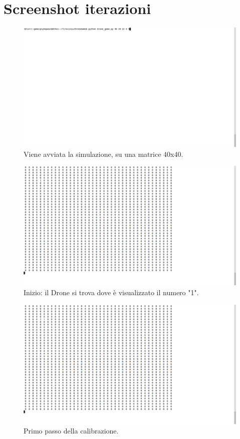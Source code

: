 \section{Screenshot iterazioni}

\begin{figure}[hb]
\center
\includegraphics[width=\textwidth]{immagini/Run1.png}
\caption{Viene avviata la simulazione, su una matrice 40x40.}
\end{figure}

\begin{figure}[hb]
\center
\includegraphics[width=\textwidth]{immagini/Run2.png}
\caption{Inizio: il Drone si trova dove è visualizzato il numero "1".}
\end{figure}

\begin{figure}[hb]
\center
\includegraphics[width=\textwidth]{immagini/Run3.png}
\caption{Primo passo della calibrazione.}
\end{figure}

